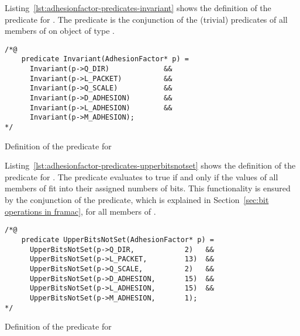 \FloatBarrier

\label{sec:adhesionfactor-predicates-invariant}

Listing~\ref{lst:adhesionfactor-predicates-invariant} shows the definition of the
 predicate for .
The predicate is the conjunction of the (trivial)  predicates
of all members of on object of type .

\begin{listing}[hbt]
\begin{minipage}{0.99\textwidth}
\begin{lstlisting}[style=acsl-block]
/*@
    predicate Invariant(AdhesionFactor* p) =
      Invariant(p->Q_DIR)             &&
      Invariant(p->L_PACKET)          &&
      Invariant(p->Q_SCALE)           &&
      Invariant(p->D_ADHESION)        &&
      Invariant(p->L_ADHESION)        &&
      Invariant(p->M_ADHESION);
*/
\end{lstlisting}
\end{minipage}
\caption{\label{lst:adhesionfactor-predicates-invariant}Definition of the  predicate for }
\end{listing}

\FloatBarrier

\label{sec:adhesionfactor-predicates-upperbitsnotset}


Listing~\ref{lst:adhesionfactor-predicates-upperbitsnotset} shows the definition
of the  predicate for .
The predicate  evaluates to true
if and only if the values of all members of 
fit into their assigned numbers of bits.
This functionality is ensured by the conjunction of the  predicate,
which is explained in Section~\ref{sec:bit operations in framac}, for all members of .

\begin{listing}[hbt]
\begin{minipage}{0.99\textwidth}
\begin{lstlisting}[style=acsl-block]
/*@
    predicate UpperBitsNotSet(AdhesionFactor* p) =
      UpperBitsNotSet(p->Q_DIR,            2)   &&
      UpperBitsNotSet(p->L_PACKET,         13)  &&
      UpperBitsNotSet(p->Q_SCALE,          2)   &&
      UpperBitsNotSet(p->D_ADHESION,       15)  &&
      UpperBitsNotSet(p->L_ADHESION,       15)  &&
      UpperBitsNotSet(p->M_ADHESION,       1);
*/
\end{lstlisting}
\end{minipage}
\caption{\label{lst:adhesionfactor-predicates-upperbitsnotset}Definition of the  predicate for }
\end{listing}

